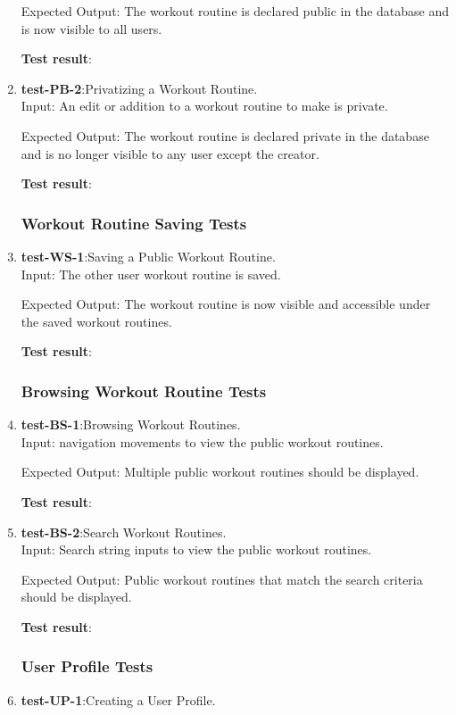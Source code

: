 \documentclass[12pt, titlepage]{article}
\begin{document}
\begin{enumerate}
	Expected Output: The workout routine is declared public in the database and is now visible to all users.
	
	\textbf{Test result}:
	
	\item{\textbf{test-PB-2}}:Privatizing a Workout Routine.\\
	
	Input: An edit or addition to a workout routine to make is private.
	
	Expected Output: The workout routine is declared private in the database and is no longer visible to any user except the creator.
	
	\textbf{Test result}:
	
\subsubsection{Workout Routine Saving Tests}
	\item{\textbf{test-WS-1}}:Saving a Public Workout Routine.\\
	
	Input: The other user workout routine is saved.
	
	Expected Output: The workout routine is now visible and accessible under the saved workout routines.
	
	\textbf{Test result}:
	
\subsubsection{Browsing Workout Routine Tests}
	\item{\textbf{test-BS-1}}:Browsing Workout Routines.\\
	
	Input: navigation movements to view the public workout routines.
	
	Expected Output: Multiple public workout routines should be displayed. 
	
	\textbf{Test result}:
	
	\item{\textbf{test-BS-2}}:Search Workout Routines.\\
	
	Input: Search string inputs to view the public workout routines.
	
	Expected Output: Public workout routines that match the search criteria should be displayed. 
	
	\textbf{Test result}:
	
\subsubsection{User Profile Tests}
	\item{\textbf{test-UP-1}}:Creating a User Profile.\\
	

\end{enumerate}
\end{document}
